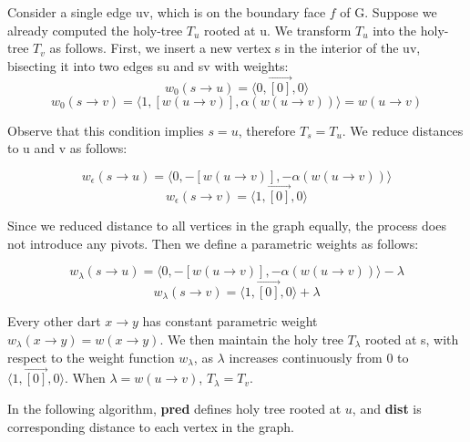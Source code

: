 \documentclass{article}
\begin{document}
Consider a single edge uv, which is on the boundary face $f$ of G. Suppose we
already computed the holy-tree $T_u$ rooted at u.  We transform $T_u$
into the holy-tree $T_v$ as follows. First, we insert a new vertex s in the
interior of the uv, bisecting it into two edges su and sv with weights:
\[ w_{0}(s \rightarrow u) = \langle 0, \vec{[0]}, 0 \rangle \]
\[ w_{0}(s \rightarrow v) = \langle 1, [w(u \rightarrow v)], 
  \alpha(w(u \rightarrow v)) \rangle = w(u \rightarrow v)\]

Observe that this condition implies $s = u$, therefore $T_s = T_u$. We reduce 
distances to u and v as follows:

\[ w_{\epsilon}(s \rightarrow u) = \langle 0, -[w(u \rightarrow v)], 
  -\alpha(w(u \rightarrow v)) \rangle \]
\[ w_{\epsilon}(s \rightarrow v) = \langle 1, \vec{[0]}, 0 \rangle \]

Since we reduced distance to all vertices in the graph equally, the process does
not introduce any pivots. Then we define a parametric weights as follows:

\[ w_{\lambda}(s \rightarrow u) = \langle 0, -[w(u \rightarrow v)], 
  -\alpha(w(u \rightarrow v)) \rangle - \lambda \]
\[ w_{\lambda}(s \rightarrow v) =  \langle 1, \vec{[0]}, 0 \rangle  + \lambda \]

Every other dart $x \rightarrow y$ has constant parametric weight 
$w_{\lambda}(x \rightarrow y) = w(x \rightarrow y)$.
We then maintain the holy tree $T_{\lambda}$ rooted at s, with respect
to the weight function $w_{\lambda}$, as $\lambda$ increases continuously from
0 to $\langle 1, \vec{[0]}, 0 \rangle$. When $\lambda = w(u \rightarrow v)$, 
$T_{\lambda} = T_v$.

In the following algorithm, \textbf{pred} defines holy tree rooted at $u$, and 
\textbf{dist} is corresponding distance to each vertex in the graph. \\

\end{document}
